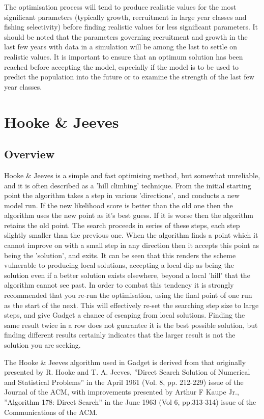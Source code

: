 \documentclass[10pt,twoside]{book}
\begin{document}
\bigskip
The optimisation process will tend to produce realistic values for the most significant parameters (typically growth, recruitment in large year classes and fishing selectivity) before finding realistic values for less significant parameters.  It should be noted that the parameters governing recruitment and growth in the last few years with data in a simulation will be among the last to settle on realistic values.  It is important to ensure that an optimum solution has been reached before accepting the model, especially if the model is to be used to predict the population into the future or to examine the strength of the last few year classes.

\section{Hooke \& Jeeves}\label{sec:hooke}
\subsection{Overview}\label{subsec:hookeover}
Hooke \& Jeeves is a simple and fast optimising method, but somewhat unreliable, and it is often described as a 'hill climbing' technique.  From the initial starting point the algorithm takes a step in various 'directions', and conducts a new model run.  If the new likelihood score is better than the old one then the algorithm uses the new point as it's best guess.  If it is worse then the algorithm retains the old point.  The search proceeds in series of these steps, each step slightly smaller than the previous one.  When the algorithm finds a point which it cannot improve on with a small step in any direction then it accepts this point as being the 'solution', and exits.  It can be seen that this renders the scheme vulnerable to producing local solutions, accepting a local dip as being the solution even if a better solution exists elsewhere, beyond a local 'hill' that the algorithm cannot see past.  In order to combat this tendency it is strongly recommended that you re-run the optimisation, using the final point of one run as the start of the next.  This will effectively re-set the searching step size to large steps, and give Gadget a chance of escaping from local solutions.  Finding the same result twice in a row does not guarantee it is the best possible solution, but finding different results certainly indicates that the larger result is not the solution you are seeking.

\bigskip
The Hooke \& Jeeves algorithm used in Gadget is derived from that originally presented by R. Hooke and T. A. Jeeves, ''Direct Search Solution of Numerical and Statistical Problems'' in the April 1961 (Vol. 8, pp. 212-229) issue of the Journal of the ACM, with improvements presented by Arthur F Kaupe Jr., ''Algorithm 178: Direct Search'' in the June 1963 (Vol 6, pp.313-314) issue of the Communications of the ACM.
\end{document}
